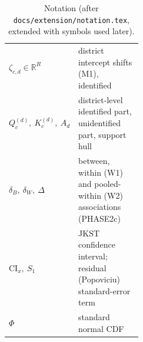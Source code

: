 \begin{table}[ht]
\begin{tabularx}{\linewidth}{@{}L{0.45\linewidth}>{\raggedright\arraybackslash}X@{}}
$\zeta_{c,d}\in\mathbb R^R$ & district intercept shifts (M1), identified \\
$Q^{(d)}_c,\ K^{(d)}_c,\ A_d$ & district-level identified part, unidentified part, support hull \\
$\delta_B,\ \delta_W,\ \Delta$ & between, within (W1) and pooled-within (W2) associations (PHASE2c) \\
$\mathrm{CI}_x,\ S_1$ & JKST confidence interval; residual (Popoviciu) standard-error term \\
$\Phi$ & standard normal CDF \\
\bottomrule
\end{tabularx}
\caption{Notation (after \texttt{docs/extension/notation.tex}, extended with symbols used later).}\label{tab:notation}
\end{table}
